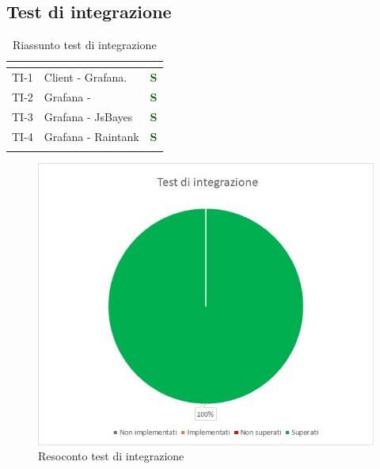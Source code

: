 \subsection{Test di integrazione}
\normalsize
\renewcommand{\arraystretch}{1}
\begin{longtable}{|C{2.5cm}|C{4.5cm}|C{2.5cm}|}
	\hline
	\textbf{\color{title_text}{Test}} & \textbf{\color{title_text}{Componente}} & \textbf{\color{title_text}{Stato}} \\
	\hline
	\endhead
	{TI-1} & Client - Grafana. & \textcolor{darkgreen}{\textbf{S}}\\
	\hline
	{TI-2} & Grafana -  & \textcolor{darkgreen}{\textbf{S}}\\
	\hline
	{TI-3} & Grafana - JsBayes & \textcolor{darkgreen}{\textbf{S}}\\
	\hline
	{TI-4} & Grafana - Raintank & \textcolor{darkgreen}{\textbf{S}}\\
	\hline
	\caption{Riassunto test di integrazione}
	\label{tabella:riassunto ta}
\end{longtable}
\renewcommand{\arraystretch}{1}
\begin{figure} [H]
	\centering
	\includegraphics[scale=1]{Img/TI}
	\caption{Resoconto test di integrazione}\label{}
\end{figure}
\newpage


